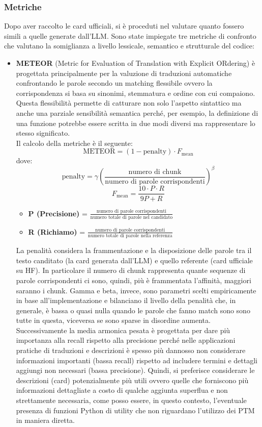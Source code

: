 \documentclass{article}
\begin{document}
\subsubsection{Metriche}
Dopo aver raccolto le card ufficiali, si è proceduti nel valutare quanto fossero simili a quelle generate dall'LLM. Sono state impiegate tre metriche di confronto che valutano la somiglianza a livello lessicale, semantico e strutturale del codice:
\begin{itemize}
    \item \textbf{METEOR} (Metric for Evaluation of Translation with Explicit ORdering) \cite{banerjee2005meteor} è progettata principalmente per la valuzione di traduzioni automatiche confrontando le parole secondo un matching flessibile ovvero la corrispondenza si basa su sinonimi, stemmatura e ordine con cui compaiono. Questa flessibilità permette di catturare non solo l'aspetto sintattico ma anche una parziale sensibilità semantica perché, per esempio, la definizione di una funzione potrebbe essere scritta in due modi diversi ma rappresentare lo stesso significato.\\
    Il calcolo della metriche è il seguente:
    \[
    \text{METEOR} = (1 - \text{penalty}) \cdot F_{\text{mean}}
    \]
    dove:
    \[
        \text{penalty} = \gamma \left( \frac{\text{numero di chunk}}{\text{numero di parole corrispondenti}} \right)^\beta
    \]
    \[
        F_{\text{mean}} = \frac{10 \cdot P \cdot R}{9P + R}
    \]
    \begin{itemize}
        \item \textbf{P (Precisione)} = $\frac{\text{numero di parole corrispondenti}}{\text{numero totale di parole nel candidato}}$
        \item \textbf{R (Richiamo)} = $\frac{\text{numero di parole corrispondenti}}{\text{numero totale di parole nella referenza}}$
    \end{itemize}
    La penalità considera la frammentazione e la disposizione delle parole tra il testo canditato (la card generata dall'LLM) e quello referente (card ufficiale su HF). In particolare il numero di chunk rappresenta quante sequenze di parole corrispondenti ci sono, quindi, più è frammentata l'affinità, maggiori saranno i chunk. Gamma e beta, invece, sono parametri scelti empiricamente in base all'implementazione e bilanciano il livello della penalità che, in generale, è bassa o quasi nulla quando le parole che fanno match sono sono tutte in questa, viceversa se sono sparse in disordine aumenta.\\
    Successivamente la media armonica pesata è progettata per dare più importanza alla recall rispetto alla precisione perché nelle applicazioni pratiche di traduzioni e descrizioni è spesso più dannosso non considerare informazioni importanti (bassa recall) rispetto ad includere termini e dettagli aggiungi non necessari (bassa precisione). Quindi, si preferisce considerare le descrizioni (card) potenzialmente più utili ovvero quelle che forniscono più informazioni dettagliate a costo di qualche aggiunta superflua e non strettamente necessaria, come posso essere, in questo contesto, l'eventuale presenza di funzioni Python di utility che non riguardano l'utilizzo dei PTM in maniera diretta.\\

\end{itemize}
\end{document}
